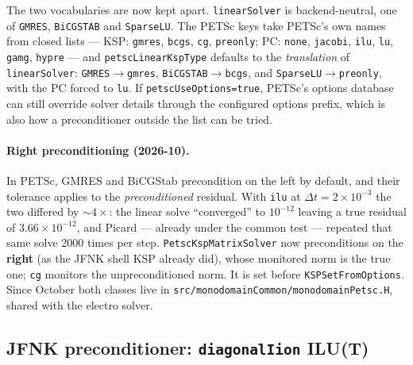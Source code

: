 \documentclass[11pt,a4paper]{article}
\newcommand{\code}[1]{\texttt{\small #1}}
\begin{document}
The two vocabularies are now kept apart. \code{linearSolver} is backend-neutral,
one of \code{GMRES}, \code{BiCGSTAB} and \code{SparseLU}. The PETSc keys take
PETSc's own names from closed lists --- KSP: \code{gmres}, \code{bcgs},
\code{cg}, \code{preonly}; PC: \code{none}, \code{jacobi}, \code{ilu},
\code{lu}, \code{gamg}, \code{hypre} --- and \code{petscLinearKspType} defaults
to the \emph{translation} of \code{linearSolver}: \code{GMRES}$\to$\code{gmres},
\code{BiCGSTAB}$\to$\code{bcgs}, and \code{SparseLU}$\to$\code{preonly}, with
the PC forced to \code{lu}. If \code{petscUseOptions=true}, PETSc's options
database can still override solver details through the configured options
prefix, which is also how a preconditioner outside the list can be tried.

\paragraph{Right preconditioning (2026-10).} In PETSc, GMRES and BiCGStab
precondition on the left by default, and their tolerance applies to the
\emph{preconditioned} residual. With \code{ilu} at $\Delta t=2\times10^{-3}$ the
two differed by $\sim4\times$: the linear solve ``converged'' to $10^{-12}$ leaving
a true residual of $3.66\times10^{-12}$, and Picard --- already under the common
test --- repeated that same solve 2000 times per step. \code{PetscKspMatrixSolver}
now preconditions on the \textbf{right} (as the JFNK shell KSP already did), whose
monitored norm is the true one; \code{cg} monitors the unpreconditioned norm. It
is set before \code{KSPSetFromOptions}. Since October both classes live in
\code{src/monodomainCommon/monodomainPetsc.H}, shared with the electro solver.

\subsection{JFNK preconditioner: \texorpdfstring{\code{diagonalIion}}{diagonalIion} ILU(T)}
\end{document}
